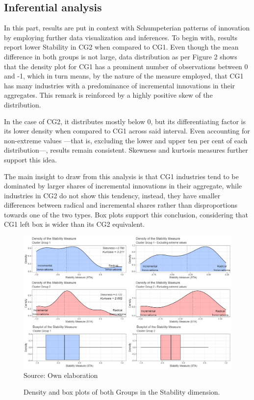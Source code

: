 \documentclass[12pt,a4paper]{article}
\begin{document}
\subsection{Inferential analysis}


In this part, results are put in context with Schumpeterian patterns of innovation by employing further data visualization and inferences. To begin with, results report lower Stability in CG2 when compared to CG1. Even though the mean difference in both groups is not large, data distribution as per Figure 2 shows that the density plot for CG1 has a prominent number of observations between 0 and -1, which in turn means, by the nature of the measure employed, that CG1 has many industries with a predominance of incremental innovations in their aggregates. This remark is reinforced by a highly positive skew of the distribution. 

In the case of CG2, it distributes mostly below 0, but its differentiating factor is its lower density when compared to CG1 across said interval. Even accounting for non-extreme values —that is, excluding the lower and upper ten per cent of each distribution—, results remain consistent. Skewness and kurtosis measures further support this idea. 

The main insight to draw from this analysis is that CG1 industries tend to be dominated by larger shares of incremental innovations in their aggregate, while industries in CG2 do not show this tendency, instead, they have smaller differences between radical and incremental shares rather than disproportions towards one of the two types. Box plots support this conclusion, considering that CG1 left box is wider than its CG2 equivalent.

\begin{figure}[H]	
	\caption{Density and box plots of both Groups in the Stability dimension.}
	\centering
	\includegraphics[scale = 0.45]{sta.png}
		Source: Own elaboration
\end{figure}
\end{document}
